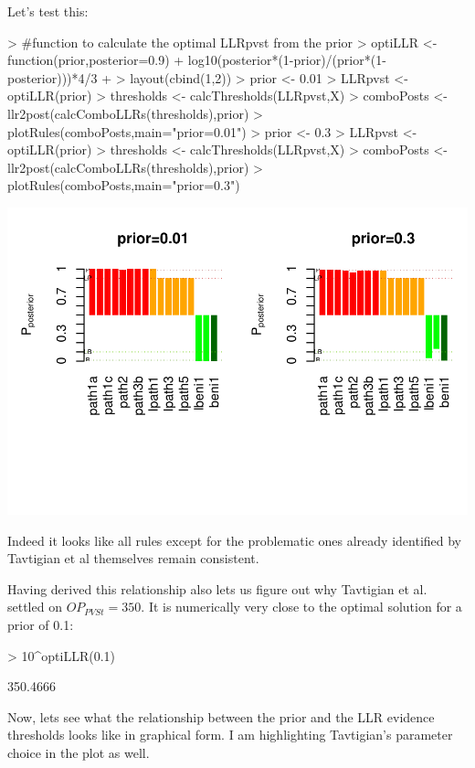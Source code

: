 \documentclass[12pt]{article}
\begin{document}
Let's test this:

\begin{Schunk}
\begin{Sinput}
> #function to calculate the optimal LLRpvst from the prior
> optiLLR <- function(prior,posterior=0.9) {
+ 	log10(posterior*(1-prior)/(prior*(1-posterior)))*4/3
+ }
> layout(cbind(1,2))
> prior <- 0.01
> LLRpvst <- optiLLR(prior)
> thresholds <- calcThresholds(LLRpvst,X)
> comboPosts <- llr2post(calcComboLLRs(thresholds),prior)
> plotRules(comboPosts,main="prior=0.01")
> prior <- 0.3
> LLRpvst <- optiLLR(prior)
> thresholds <- calcThresholds(LLRpvst,X)
> comboPosts <- llr2post(calcComboLLRs(thresholds),prior)
> plotRules(comboPosts,main="prior=0.3")
\end{Sinput}
\end{Schunk}
\includegraphics{tavtigian-004}

Indeed it looks like all rules except for the problematic ones already identified
by Tavtigian et al themselves remain consistent.

Having derived this relationship also lets us figure out why Tavtigian et al.
settled on $OP_{PVSt}=350$. It is numerically very close to the optimal solution
for a prior of 0.1:

\begin{Schunk}
\begin{Sinput}
> 10^optiLLR(0.1)
\end{Sinput}
\begin{Soutput}
[1] 350.4666
\end{Soutput}
\end{Schunk}

Now, lets see what the relationship between the prior and the LLR evidence
thresholds looks like in graphical form. I am highlighting Tavtigian's parameter choice in the plot as well.
\end{document}
